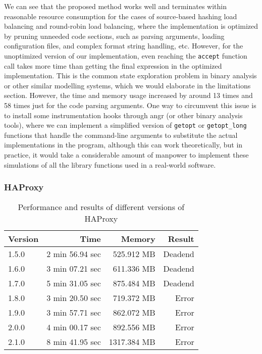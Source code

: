 We can see that the proposed method works well and terminates within reasonable
resource consumption for the cases of source-based hashing load balancing and
round-robin load balancing, where the implementation is optimized by pruning
unneeded code sections, such as parsing arguments, loading configuration
files, and complex format string handling, etc. However, for the unoptimized
version of our implementation, even reaching the \texttt{accept} function call
takes more time than getting the final expression in the optimized
implementation. This is the common state exploration problem in binary analysis
or other similar modelling systems, which we would elaborate in the limitations
section. However, the time and memory usage increased by around 13 times and 58
times just for the code parsing arguments. One way to circumvent this issue is
to install some instrumentation hooks through angr (or other binary analysis
tools), where we can implement a simplified version of \texttt{getopt} or
\texttt{getopt\_long} functions that handle the command-line arguments to
substitute the actual implementations in the program, although this can work
theoretically, but in practice, it would take a considerable amount of manpower
to implement these simulations of all the library functions used in a real-world
software.

\subsubsection{HAProxy}

\begin{table}
\centering
\begin{tabular}{l r r r}
\toprule
\textbf{Version} & \textbf{Time} & \textbf{Memory} & \textbf{Result}\\
\midrule
    1.5.0 & 2 min 56.94 sec &  525.912 MB & Deadend \\
    1.6.0 & 3 min 07.21 sec &  611.336 MB & Deadend \\
    1.7.0 & 5 min 31.05 sec &  875.484 MB & Deadend \\
    1.8.0 & 3 min 20.50 sec &  719.372 MB & Error \\
    1.9.0 & 3 min 57.71 sec &  862.072 MB & Error \\
    2.0.0 & 4 min 00.17 sec &  892.556 MB & Error \\
    2.1.0 & 8 min 41.95 sec & 1317.384 MB & Error \\
\bottomrule
\end{tabular}
\caption{Performance and results of different versions of HAProxy}
\label{perf-haproxy}
\end{table}

